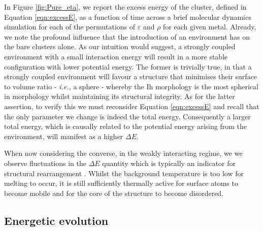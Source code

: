 In Figure \ref{fig:Pure_eta}, we report the excess energy of the cluster, defined in Equation \ref{eqn:excessE}, as a function of time across a brief molecular dynamics simulation for each of the permutations of $\varepsilon$ and $\rho$ for each given metal. Already, we note the profound influence that the introduction of an environment has on the bare clusters alone. As our intuition would suggest, a strongly coupled environment with a small interaction energy will result in a more stable configuration with lower potential energy. The former is trivially true, in that a strongly coupled environment will favour a structure that minimises their surface to volume ratio - \textit{i.e.,} a sphere - whereby the Ih morphology is the most spherical in morphology whilst maintaining its structural integrity. As for the latter assertion, to verify this we must reconsider Equation \ref{eqn:excessE} and recall that the only parameter we change is indeed the total energy. Consequently a larger total energy, which is causally related to the potential energy arising from the environment, will manifest as a higher $\Delta E$.

When now considering the converse, in the weakly interacting regime, we we observe fluctuations in the $\Delta E$ quantity which is typically an indicator for structural rearrangement \cite{LaiaMelt}. Whilst the background temperature is too low for melting to occur, it is still sufficiently thermally active for surface atoms to become mobile and for the core of the structure to become disordered.

\subsection{Energetic evolution}

